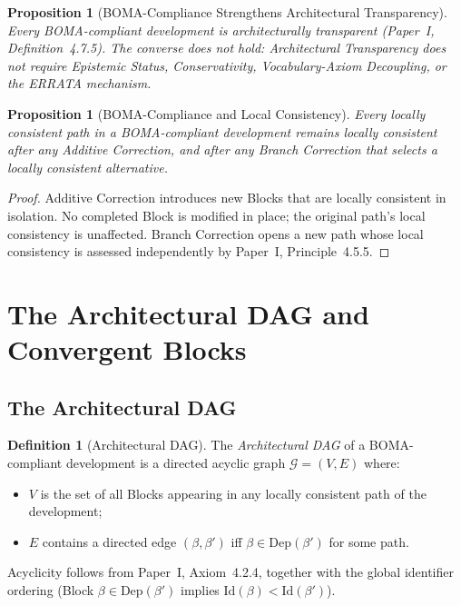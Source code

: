 \documentclass[12pt, a4paper]{article}
\theoremstyle{plain}
\newtheorem{proposition}[theorem]{Proposition}
\theoremstyle{definition}
\newtheorem{definition}[theorem]{Definition}
\theoremstyle{remark}
\newcommand{\BOMA}{\textsf{BOMA}}
\begin{document}
\begin{proposition}[\BOMA{}-Compliance Strengthens Architectural Transparency]
\label{prop:comp-at}
Every \BOMA{}-compliant development is architecturally transparent
(Paper~I, Definition~4.7.5). The converse does not hold:
Architectural Transparency does not require Epistemic Status,
Conservativity, Voc\-ab\-u\-lary-Axiom Decoupling, or the ERRATA
mechanism.
\end{proposition}

\begin{proposition}[\BOMA{}-Compliance and Local Consistency]
\label{prop:comp-lc}
Every locally consistent path in a \BOMA{}-compliant development
remains locally consistent after any Additive Correction, and after
any Branch Correction that selects a locally consistent alternative.
\end{proposition}

\begin{proof}
Additive Correction introduces new Blocks that are locally consistent
in isolation. No completed Block is modified in place; the original
path's local consistency is unaffected. Branch Correction opens a new
path whose local consistency is assessed independently by Paper~I,
Principle~4.5.5.
\end{proof}

\section{The Architectural DAG and Convergent Blocks}
\label{sec:dag}

\subsection{The Architectural DAG}
\label{subsec:dag-def}

\begin{definition}[Architectural DAG]
\label{def:dag}
The \emph{Architectural DAG} of a \BOMA{}-compliant development is a
directed acyclic graph $\mathcal{G} = (V, E)$ where:
\begin{itemize}
  \item $V$ is the set of all Blocks appearing in any locally
        consistent path of the development;
  \item $E$ contains a directed edge $(\beta, \beta')$ iff
        $\beta \in \mathrm{Dep}(\beta')$ for some path.
\end{itemize}
Acyclicity follows from Paper~I, Axiom~4.2.4, together with the
global identifier ordering (Block $\beta \in \mathrm{Dep}(\beta')$
implies $\mathrm{Id}(\beta) < \mathrm{Id}(\beta')$).
\end{definition}
\end{document}
